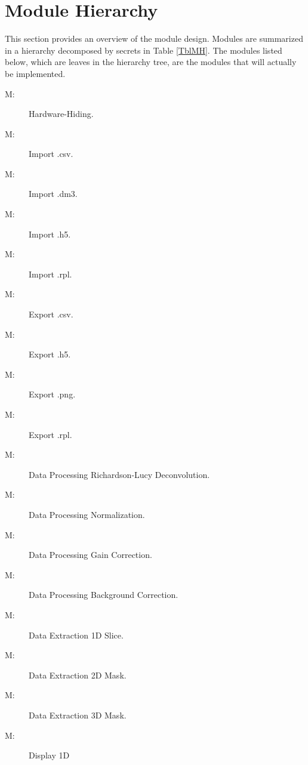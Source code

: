 \documentclass[12pt, titlepage]{article}
\newcounter{mnum}
\newcommand{\mthemnum}{M\themnum}
\begin{document}
\section{Module Hierarchy} \label{SecMH}

This section provides an overview of the module design. Modules are summarized
in a hierarchy decomposed by secrets in Table \ref{TblMH}. The modules listed
below, which are leaves in the hierarchy tree, are the modules that will
actually be implemented.

\begin{description}
	\item [ \mthemnum \label{mHH}:] Hardware-Hiding.
	\item [ \mthemnum \label{mcsvIm}:] Import .csv.
	\item [ \mthemnum \label{mdm3Im}:] Import .dm3.
	\item [ \mthemnum \label{mh5Im}:] Import .h5.
	\item [ \mthemnum \label{mrplIm}:] Import .rpl.
	\item [ \mthemnum \label{mcsvEx}:] Export .csv.
	\item [ \mthemnum \label{mh5Ex}:] Export .h5.
	\item [ \mthemnum \label{mpngEx}:] Export .png.
	\item [ \mthemnum \label{mrplEx}:] Export .rpl.
	\item [ \mthemnum \label{mRL}:] Data Processing
Richardson-Lucy Deconvolution.
	\item [ \mthemnum \label{mNorm}:] Data Processing
Normalization.
	\item [ \mthemnum \label{mGain}:] Data Processing Gain
Correction.
	\item [ \mthemnum \label{mBkgnd}:] Data Processing
Background Correction.
	\item [ \mthemnum \label{m1Dslice}:] Data Extraction 1D
Slice.
	\item [ \mthemnum \label{m2Dmask}:] Data Extraction 2D
Mask.
	\item [ \mthemnum \label{m3Dmask}:] Data Extraction 3D
Mask.
	\item [ \mthemnum \label{m1Dspecdisplay}:] Display 1D

\end{description}
\end{document}
